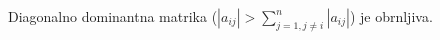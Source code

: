 \documentclass[a4paper,10pt]{article}
\theoremstyle{definition}
\begin{document}
Diagonalno dominantna matrika ($|a_{ij}| > \sum_{j=1, j\neq i}^n|a_{ij}|$) je obrnljiva.




%



%
%
%
%
%
%
%
%
\end{document}

